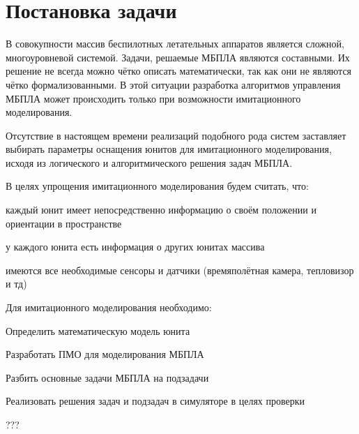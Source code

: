 \section{Постановка задачи}

В совокупности массив беспилотных летательных аппаратов является сложной,
многоуровневой системой. Задачи, решаемые МБПЛА являются составными.
Их решение не всегда можно чётко описать математически, так как они не
являются чётко формализованными.  В этой ситуации разработка алгоритмов
управления МБПЛА может происходить только при возможности имитационного
моделирования.

Отсутствие в настоящем времени реализаций подобного рода систем заставляет
выбирать параметры оснащения юнитов для имитационного моделирования, исходя
из логического и алгоритмического решения задач МБПЛА.

В целях упрощения имитационного моделирования будем считать, что:

\begin{mintemize}
\item каждый юнит имеет непосредственно информацию о своём положении и ориентации в пространстве
\item у каждого юнита есть информация о других юнитах массива
\item имеются все необходимые сенсоры и датчики (времяполётная камера, тепловизор и тд)
\end{mintemize}

Для имитационного моделирования необходимо:

\begin{mintemize}
\item Определить математическую модель юнита
\item Разработать ПМО для моделирования МБПЛА
\item Разбить основные задачи МБПЛА на подзадачи
\item Реализовать решения задач и подзадач в симуляторе
      в целях проверки
\end{mintemize}

???
